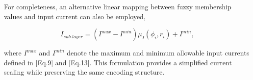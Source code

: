 For completeness, an alternative linear mapping between fuzzy membership values and input current can also be employed,

\begin{equation} \label{Eq.NS.2}
    I_{sub\text{-}layer}
    =
    \left(I^{max} - I^{min}\right)\mu_{I}(\phi_{i},r_{i}) + I^{min},
\end{equation}

\noindent
where $I^{max}$ and $I^{min}$ denote the maximum and minimum allowable input currents defined in \eqref{Eq.9} and \eqref{Eq.13}. This formulation provides a simplified current scaling while preserving the same encoding structure.






